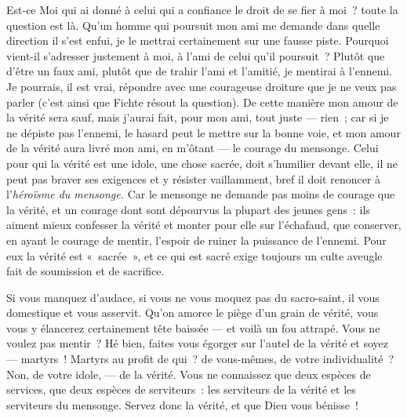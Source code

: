 \documentclass[french,twoside]{book} %
\begin{document}
Est-ce Moi qui ai donné à celui qui a confiance le droit de se fier à moi ? toute la question est là. Qu’un homme qui poursuit mon ami me demande dans quelle direction il s’est enfui, je le mettrai certainement sur une fausse piste. Pourquoi vient-il s’adresser justement à moi, à l’ami de celui qu’il poursuit ? Plutôt que d’être un faux ami, plutôt que de trahir l’ami et l’amitié, je mentirai à l’ennemi. Je pourrais, il est vrai, répondre avec une courageuse droiture que je ne veux pas parler (c’est ainsi que Fichte résout la question). De cette manière mon amour de la vérité sera sauf, mais j’aurai fait, pour mon ami, tout juste — rien ; car si je ne dépiste pas l’ennemi, le hasard peut le mettre sur la bonne voie, et mon amour de la vérité aura livré mon ami, en m’ôtant — le courage du mensonge. Celui pour qui la vérité est une idole, une chose sacrée, doit s’humilier devant elle, il ne peut pas braver ses exigences et y résister vaillamment, bref il doit renoncer à l’\emph{héroïsme du mensonge.} Car le mensonge ne demande pas moins de courage que la vérité, et un courage dont sont dépourvus la plupart des jeunes gens : ils aiment mieux confesser la vérité et monter pour elle sur l’échafaud, que conserver, en ayant le courage de mentir, l’espoir de ruiner la puissance de l’ennemi. Pour eux la vérité est « sacrée », et ce qui est sacré exige toujours un culte aveugle fait de soumission et de sacrifice.\par
Si vous manquez d’audace, si vous ne vous moquez  pas du sacro-saint, il vous domestique et vous asservit. Qu’on amorce le piège d’un grain de vérité, vous vous y élancerez certainement tête baissée — et voilà un fou attrapé. Vous ne voulez pas mentir ? Hé bien, faites vous égorger sur l’autel de la vérité et soyez — martyrs ! Martyrs au profit de qui ? de vous-mêmes, de votre individualité ? Non, de votre idole, — de la vérité. Vous ne connaissez que deux espèces de services, que deux espèces de serviteurs : les serviteurs de la vérité et les serviteurs du mensonge. Servez donc la vérité, et que Dieu vous bénisse !\par
\end{document}
